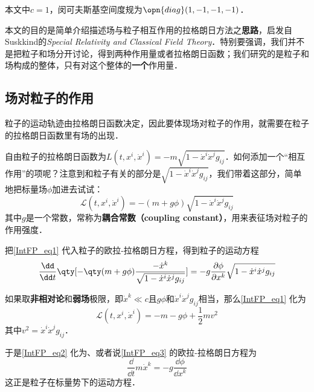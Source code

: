 

本文中$c=1$，闵可夫斯基空间度规为$\opn{diag}(1, -1, -1, -1)$．

本文的目的是简单介绍描述场与粒子相互作用的拉格朗日方法之\textbf{思路}，启发自Suskkind的\textsl{Special Relativity and Classical Field Theory}\cite{SusskindClassicalFields}．特别要强调，我们并不是把粒子和场分开讨论，得到两种作用量或者拉格朗日函数；我们研究的是粒子和场构成的整体，只有对这个整体的\textbf{一个}作用量．

\subsection{场对粒子的作用}

粒子的运动轨迹由拉格朗日函数决定，因此要体现场对粒子的作用，就需要在粒子的拉格朗日函数里有场的出现．

自由粒子的拉格朗日函数为$L(t, x^i, \dot{x}^i) = -m\sqrt{1-\dot{x}^i\dot{x}^jg_{ij}}$．如何添加一个“相互作用”的项呢？注意到和粒子有关的部分是$\sqrt{1-\dot{x}^i\dot{x}^jg_{ij}}$，我们带着这部分，简单地把标量场$\phi$加进去试试：
\begin{equation}\label{IntFP_eq1}
\mathcal{L}(t, x^i, \dot{x}^i) = -(m+g\phi)\sqrt{1-\dot{x}^i\dot{x}^jg_{ij}}
\end{equation}
其中$g$是一个常数，常称为\textbf{耦合常数（coupling constant）}，用来表征场对粒子的作用强度．

把\autoref{IntFP_eq1} 代入粒子的欧拉-拉格朗日方程，得到粒子的运动方程
\begin{equation}\label{IntFP_eq2}
\frac{\dd }{\dd t} \qty[-\qty(m+g\phi)\frac{-\dot{x}^k}{\sqrt{1-\dot{x}^i\dot{x}^jg_{ij}}}] = -g\frac{\partial \phi}{\partial x^k}\sqrt{1-\dot{x}^i\dot{x}^jg_{ij}}
\end{equation}

如果取\textbf{非相对论}和\textbf{弱场}极限，即$\dot{x}^k\ll c$且$g\phi$和$\dot{x}^i\dot{x}^jg_{ij}$相当，那么\autoref{IntFP_eq1} 化为
\begin{equation}\label{IntFP_eq3}
\mathcal{L}(t, x^i, \dot{x}^i) = -m-g\phi+\frac{1}{2}mv^2
\end{equation}
其中$v^2=\dot{x}^i\dot{x}^jg_{ij}$．

于是\autoref{IntFP_eq2} 化为、或者说\autoref{IntFP_eq3} 的欧拉-拉格朗日方程为
\begin{equation}\label{IntFP_eq4}
\frac{\dd}{\dd t} m\dot{x}^k = -g\frac{\dd \phi}{\dd x^k}
\end{equation}
这正是粒子在标量势下的运动方程．

